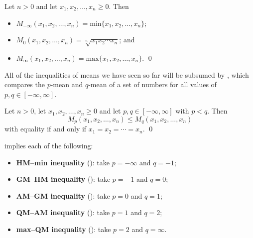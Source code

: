 \begin{proposition}
\label{propZeroAndInfinityMeans}
Let $n > 0$ and let $x_1,x_2,\dots,x_n \ge 0$. Then
\begin{itemize}
\item $M_{-\infty}(x_1,x_2,\dots,x_n) = \mathrm{min}\{ x_1,x_2,\dots,x_n \}$;
\item $M_0(x_1,x_2,\dots,x_n) = \sqrt[n]{x_1x_2\cdots x_n}$; and
\item $M_{\infty}(x_1,x_2,\dots,x_n) = \mathrm{max}\{ x_1,x_2,\dots,x_n \}$. \qed
\end{itemize}
\end{proposition}

All of the inequalities of means we have seen so far will be subsumed by , which compares the $p$-mean and $q$-mean of a set of numbers for all values of $p,q \in [-\infty,\infty]$.

\begin{theorem}
\label{thmGeneralisedMeanInequality}
Let $n > 0$, let $x_1,x_2,\dots,x_n \ge 0$ and let $p,q \in [-\infty,\infty]$ with $p<q$. Then
\[ M_p(x_1,x_2,\dots,x_n) \le M_q(x_1,x_2,\dots,x_n) \]
with equality if and only if $x_1=x_2=\cdots=x_n$. \qed
\end{theorem}

 implies each of the following:
\begin{itemize}
\item \textbf{HM--min inequality} (): take $p=-\infty$ and $q=-1$;
\item \textbf{GM--HM inequality} (): take $p=-1$ and $q=0$;
\item \textbf{AM--GM inequality} (): take $p=0$ and $q=1$;
\item \textbf{QM--AM inequality} (): take $p=1$ and $q=2$;
\item \textbf{max--QM inequality} (): take $p=2$ and $q=\infty$.
\end{itemize}